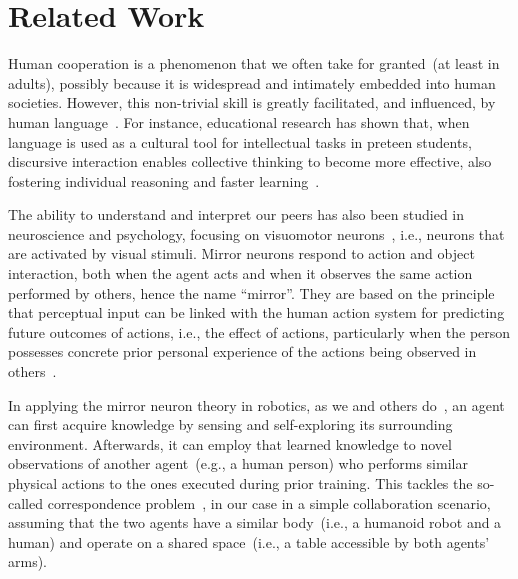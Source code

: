 
\section{Related Work}
\label{sec:related_work}

Human cooperation is a phenomenon that we often take for granted~(at least in adults), possibly because it is widespread and intimately embedded into human societies.
However, this non-trivial skill is greatly facilitated, and influenced, by human language~\cite{mueller:2000:psych}.
For instance, educational research has shown that, when language is used as a cultural tool for intellectual tasks in preteen students, discursive interaction enables collective thinking to become more effective, also fostering individual reasoning and faster learning~\cite{rojas:2003:ijer}. %

The ability to understand and interpret our peers has also been studied in neuroscience and psychology, focusing on visuomotor neurons~\cite{rizzolatti:2001:nrn}, i.e., neurons that are activated by visual stimuli.
Mirror neurons respond to action and object interaction, both when the agent acts and when it observes the same action performed by others, hence the name ``mirror''.
They are based on the principle that perceptual input can be linked with the human action system for predicting future outcomes of actions, i.e., the effect of actions, particularly when the person possesses concrete prior personal experience of the actions being observed in others~\cite{aglioti:2008:basketball,knoblich:2001:psychsci}.

In applying the mirror neuron theory in robotics, as we and others do~\cite{gazzola:2007:neuroimage,lopes:2009:ab}, an agent can first acquire knowledge by sensing and self-exploring its surrounding environment. %
Afterwards, it can employ that learned knowledge to novel observations of another agent~(e.g., a human person) who performs similar physical actions to the ones executed during prior training.
This tackles the so-called correspondence problem~\cite{nehaniv:2002:correspondence}, in our case in a simple collaboration scenario, assuming that the two agents have a similar body~(i.e., a humanoid robot and a human) and operate on a shared space~(i.e., a table accessible by both agents' arms).

